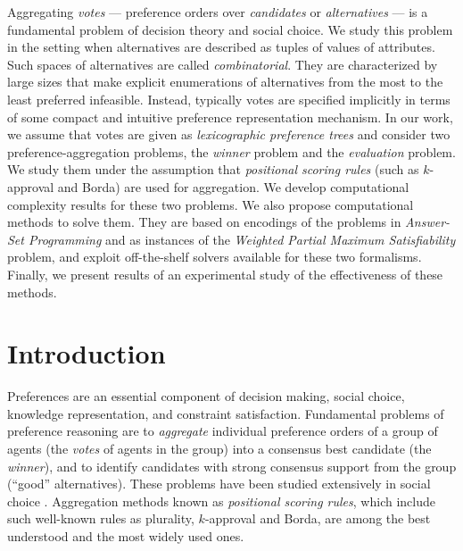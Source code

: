 Aggregating \emph{votes} --- preference orders over \emph{candidates} 
or \emph{alternatives} --- is a fundamental problem of decision theory 
and social choice. We study this problem in the setting when 
alternatives are described as tuples of values of attributes. Such spaces of 
alternatives are called \emph{combinatorial}. They are characterized by 
large sizes that make explicit enumerations of alternatives from the most 
to the least preferred infeasible. Instead, typically votes are specified 
implicitly 
in terms of some compact and intuitive preference representation mechanism. 
In our work, we assume that votes are given as \textit{lexicographic 
preference trees} and consider two preference-aggregation problems, the 
\emph{winner} problem and the \emph{evaluation} problem. We study them 
under the assumption that \textit{positional scoring rules} (such as 
$k$-approval and Borda) are used for aggregation. We develop computational 
complexity results for these two problems. We also propose computational 
methods to solve 
them. They are based on encodings of the problems in \textit{Answer-Set 
Programming} and as instances of the \textit{Weighted Partial Maximum 
Satisfiability} problem, and exploit off-the-shelf solvers available for 
these two formalisms. Finally, we present results of an experimental study 
of the effectiveness of these methods.

\section{Introduction}
Preferences are an essential component of decision making, social choice,
knowledge representation, and constraint satisfaction. Fundamental 
problems of preference reasoning are to \emph{aggregate} individual 
preference orders of a group of agents (the \emph{votes} of agents in 
the group) into a consensus best candidate (the \emph{winner}), and to 
identify candidates with strong consensus support from the group 
(``good'' alternatives). These problems
have been studied extensively in social choice \cite{arrowhandbook}. 
Aggregation methods known as \emph{positional scoring rules}, which include
such well-known rules as plurality, $k$-approval and Borda, are
among the best understood and the most widely used ones.
 
